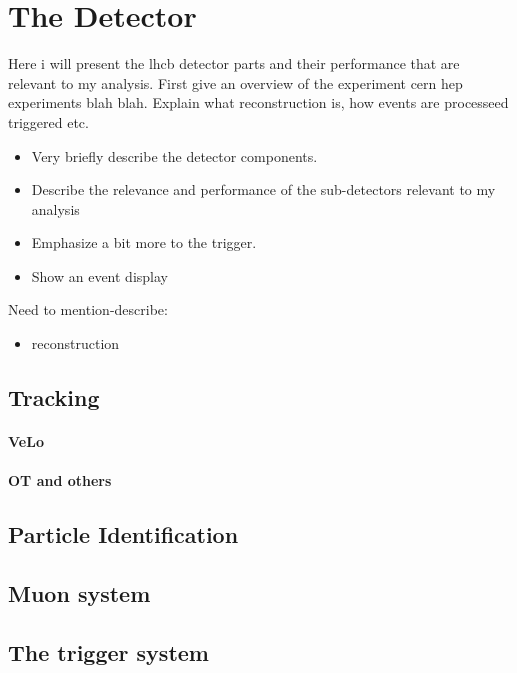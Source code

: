 

\chapter{The \lhcb Detector}
\label{lhcb_detector}

Here i will present the lhcb detector parts and their performance that are relevant to my analysis.
First give an overview of the experiment cern hep experiments blah blah. Explain what reconstruction
is, how events are processeed triggered etc.

\begin{itemize}
  \item Very briefly describe the detector components.
  \item Describe the relevance and performance of the sub-detectors relevant to my analysis
  \item Emphasize a bit more to the trigger.
  \item Show an event display
\end{itemize}

Need to mention-describe:
\begin{itemize}
  \item reconstruction
\end{itemize}



\section{Tracking}
\subsubsection{VeLo}
\subsubsection{OT and others}

\section{Particle Identification}

\section{Muon system}

\section{The trigger system}

